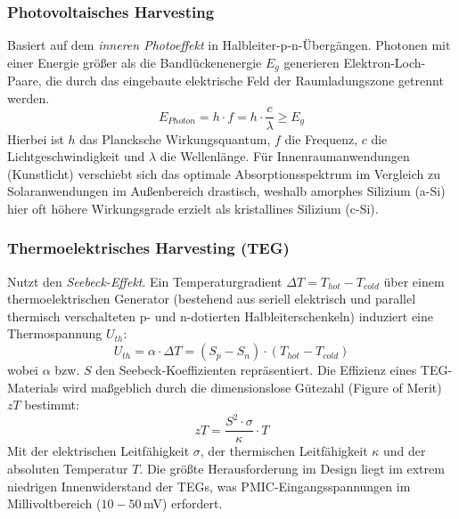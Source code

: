 \documentclass[8pt,a4paper]{article}
\begin{document}
\subsubsection{Photovoltaisches Harvesting}
Basiert auf dem \textit{inneren Photoeffekt} in Halbleiter-p-n-Übergängen. Photonen mit einer Energie größer als die Bandlückenenergie $E_g$ generieren Elektron-Loch-Paare, die durch das eingebaute elektrische Feld der Raumladungszone getrennt werden.
\begin{equation}
    E_{Photon} = h \cdot f = h \cdot \frac{c}{\lambda} \ge E_g
\end{equation}
Hierbei ist $h$ das Plancksche Wirkungsquantum, $f$ die Frequenz, $c$ die Lichtgeschwindigkeit und $\lambda$ die Wellenlänge. Für Innenraumanwendungen (Kunstlicht) verschiebt sich das optimale Absorptionsspektrum im Vergleich zu Solaranwendungen im Außenbereich drastisch, weshalb amorphes Silizium (a-Si) hier oft höhere Wirkungsgrade erzielt als kristallines Silizium (c-Si).

\subsubsection{Thermoelektrisches Harvesting (TEG)}
Nutzt den \textit{Seebeck-Effekt}. Ein Temperaturgradient $\Delta T = T_{hot} - T_{cold}$ über einem thermoelektrischen Generator (bestehend aus seriell elektrisch und parallel thermisch verschalteten p- und n-dotierten Halbleiterschenkeln) induziert eine Thermospannung $U_{th}$:
\begin{equation}
    U_{th} = \alpha \cdot \Delta T = (S_p - S_n) \cdot (T_{hot} - T_{cold})
\end{equation}
wobei $\alpha$ bzw. $S$ den Seebeck-Koeffizienten repräsentiert. Die Effizienz eines TEG-Materials wird maßgeblich durch die dimensionslose Gütezahl (Figure of Merit) $zT$ bestimmt:
\begin{equation}
    zT = \frac{S^2 \cdot \sigma}{\kappa} \cdot T
\end{equation}
Mit der elektrischen Leitfähigkeit $\sigma$, der thermischen Leitfähigkeit $\kappa$ und der absoluten Temperatur $T$. Die größte Herausforderung im Design liegt im extrem niedrigen Innenwiderstand der TEGs, was PMIC-Eingangsspannungen im Millivoltbereich ($10-50$\,mV) erfordert.
\end{document}
